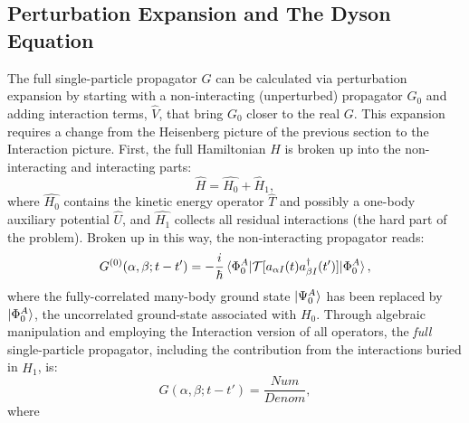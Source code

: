 \subsection{Perturbation Expansion and The Dyson Equation}
The full single-particle propagator $G$ can be calculated via perturbation
expansion by starting with a non-interacting (unperturbed) propagator $G_{0}$
and adding interaction 
terms, $\hat{V}$, that bring $G_{0}$ closer to the real $G$. This expansion requires a change from
the Heisenberg picture of the previous section to the Interaction
picture\footnotemark. First, the full Hamiltonian $H$ is broken up into the non-interacting and interacting
parts:
\begin{equation}
    \hat{H} = \hat{H_{0}}+\hat{H}_{1},
\end{equation}
where $\hat{H_{0}}$ contains the kinetic energy operator $\hat{T}$
and possibly a one-body auxiliary
potential $\hat{U}$, and $\hat{H_{1}}$ collects all residual interactions (the hard part of the
problem). Broken up in this way, the non-interacting propagator reads:
\begin{equation}
    G^{(0)}(\alpha, \beta; t-t') =
    -\frac{i}{\hbar}\braket{\Phi^{A}_{0}|
    \mathcal{T}[a_{\alpha I}(t)a^{\dagger}_{\beta I}(t')]|\Phi^{A}_{0}},
\end{equation}
where the fully-correlated many-body ground state $\ket{\Psi^{A}_{0}}$ has been replaced by
$\ket{\Phi^{A}_{0}}$, the uncorrelated ground-state associated with $H_{0}$. Through algebraic
manipulation and employing the Interaction version of all operators,
the \textit{full} single-particle propagator, including the
contribution from the interactions buried in $\hat{H_{1}}$, is:
\begin{equation} \label{FullSPPropagator}
    G(\alpha, \beta; t-t') = \frac{Num}{Denom},
\end{equation}
where
